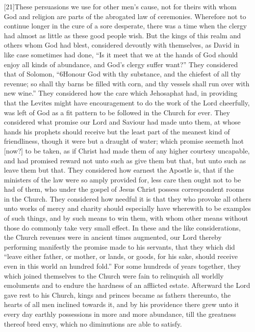 [21]These persuasions we use for other men’s cause, not for theirs with whom God and religion are parts of the abrogated law of ceremonies. Wherefore not to continue longer in the cure of a sore desperate, there was a time when the clergy had almost as little as these good people wish. But the kings of this realm and others whom God had blest, considered devoutly with themselves, as David in like case sometimes had done, “Is it meet that we at the hands of God should enjoy all kinds of abundance, and God’s clergy suffer want?” They considered that of Solomon, “6Honour God with thy substance, and the chiefest of all thy revenue; so shall thy barns be filled with corn, and thy vessels shall run over with new wine.” They considered how the care which Jehosaphat had, in providing that the Levites might have encouragement to do the work of the Lord cheerfully, was left of God as a fit pattern to be followed in the Church for  ever. They considered what promise our Lord and Saviour had made unto them, at whose hands his prophets should receive but the least part of the meanest kind of friendliness, though it were but a draught of water; which promise seemeth lnot [now?] to be taken, as if Christ had made them of any higher courtesy uncapable, and had promised reward not unto such as give them but that, but unto such as leave them but that. They considered how earnest the Apostle is, that if the ministers of the law were so amply provided for, less care then ought not to be had of them, who under the gospel of Jesus Christ possess correspondent rooms in the Church. They considered how needful it is that they who provoke all others unto works of mercy and charity should especially have wherewith to be examples of such things, and by such means to win them, with whom other means without those do commonly take very small effect. In these and the like considerations, the Church revenues were in ancient times augmented, our Lord thereby performing manifestly the promise made to his servants, that they which did “leave either father, or mother, or lands, or goods, for his sake, should receive even in this world an hundred fold.” For some hundreds of years together, they which joined themselves to the Church were fain to relinquish all worldly emoluments and to endure the hardness of an afflicted estate. Afterward the Lord gave rest to his Church, kings and princes became as fathers thereunto, the hearts of all men inclined towards it, and by his providence there grew unto it every day earthly possessions in more and more abundance, till the greatness thereof bred envy, which no diminutions are able to satisfy.

